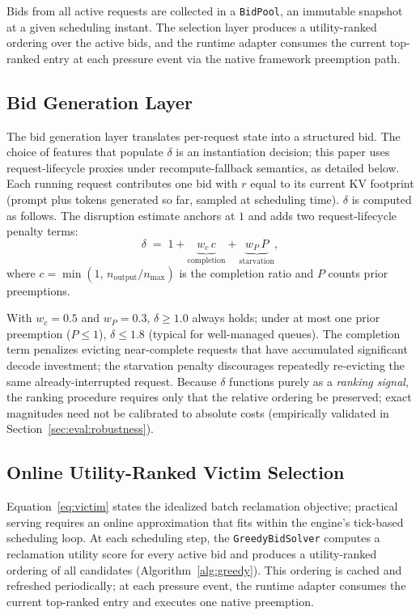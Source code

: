 \documentclass[conference]{IEEEtran}
\newcommand{\tokfree}{\ensuremath{r}}
\newcommand{\qualdelta}{\ensuremath{\delta}}
\begin{document}
Bids from all active requests are collected in a \texttt{BidPool}, an
immutable snapshot at a given scheduling instant. The selection layer produces
a utility-ranked ordering over the active bids, and the runtime adapter
consumes the current top-ranked entry at each pressure event via the native
framework preemption path.

\subsection{Bid Generation Layer}\label{sec:design:scoring}

The bid generation layer translates per-request state into a structured bid.
The choice of features that populate $\qualdelta$ is an instantiation decision;
this paper uses request-lifecycle proxies under recompute-fallback semantics,
as detailed below.  Each running request contributes one bid with
$\tokfree$ equal to its current KV footprint (prompt plus tokens generated
so far, sampled at scheduling time).  $\qualdelta$ is computed as follows.
The disruption estimate anchors at $1$ and adds two
request-lifecycle penalty terms:
\begin{equation}\label{eq:delta}
  \qualdelta \;=\; 1
    + \underbrace{w_c\, c}_{\text{completion}}
    + \underbrace{w_P\, P}_{\text{starvation}},
\end{equation}
where $c{=}\min(1,\, n_{\text{output}}/n_{\max})$ is the completion
ratio and $P$ counts prior preemptions.

With $w_c{=}0.5$ and $w_P{=}0.3$, $\qualdelta \geq 1.0$ always holds;
under at most one prior preemption ($P{\leq}1$), $\qualdelta \leq 1.8$
(typical for well-managed queues).
The completion term penalizes evicting near-complete requests that have
accumulated significant decode investment; the starvation penalty
discourages repeatedly re-evicting the same already-interrupted request.
Because $\qualdelta$ functions purely as a \emph{ranking signal}, the
ranking procedure requires only that the relative ordering be preserved; exact
magnitudes need not be calibrated to absolute costs
(empirically validated in Section~\ref{sec:eval:robustness}).

\subsection{Online Utility-Ranked Victim Selection}\label{sec:design:solver}

Equation~\ref{eq:victim} states the idealized batch reclamation objective;
practical serving requires an online approximation that fits within the
engine's tick-based scheduling loop.  At each scheduling step, the
\texttt{GreedyBidSolver} computes a reclamation utility score for every
active bid and produces a utility-ranked ordering of all candidates
(Algorithm~\ref{alg:greedy}).  This ordering is cached and refreshed
periodically; at each pressure event, the runtime adapter consumes the
current top-ranked entry and executes one native preemption.
\end{document}
